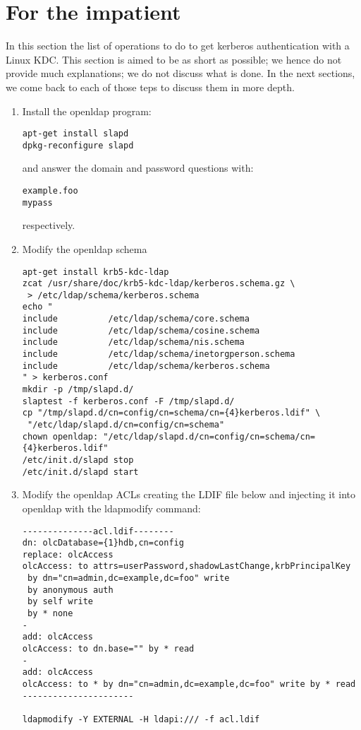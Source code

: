 \documentclass[12pt,a4]{article}
\begin{document}
\section{For the impatient}
In this section the list of operations to do to get kerberos authentication with a Linux KDC. This section is aimed to be as short as possible; we hence do not provide much explanations; we do not discuss what is done. In the next sections, we come back to each of those teps to discuss them in more depth.
\begin{enumerate}

\item Install the openldap program:
\begin{verbatim}
apt-get install slapd
dpkg-reconfigure slapd
\end{verbatim}
and answer the domain and password questions with:
\begin{verbatim}
example.foo
mypass
\end{verbatim}
respectively.
\item {Modify the openldap schema}
\begin{verbatim}
apt-get install krb5-kdc-ldap
zcat /usr/share/doc/krb5-kdc-ldap/kerberos.schema.gz \
 > /etc/ldap/schema/kerberos.schema
echo "
include          /etc/ldap/schema/core.schema
include          /etc/ldap/schema/cosine.schema
include          /etc/ldap/schema/nis.schema
include          /etc/ldap/schema/inetorgperson.schema
include          /etc/ldap/schema/kerberos.schema
" > kerberos.conf 
mkdir -p /tmp/slapd.d/
slaptest -f kerberos.conf -F /tmp/slapd.d/
cp "/tmp/slapd.d/cn=config/cn=schema/cn={4}kerberos.ldif" \
 "/etc/ldap/slapd.d/cn=config/cn=schema"
chown openldap: "/etc/ldap/slapd.d/cn=config/cn=schema/cn={4}kerberos.ldif"
/etc/init.d/slapd stop
/etc/init.d/slapd start
\end{verbatim}
\item Modify the openldap ACLs creating the LDIF file below and injecting it into openldap with the ldapmodify command:
\begin{verbatim}
--------------acl.ldif--------
dn: olcDatabase={1}hdb,cn=config
replace: olcAccess
olcAccess: to attrs=userPassword,shadowLastChange,krbPrincipalKey 
 by dn="cn=admin,dc=example,dc=foo" write 
 by anonymous auth 
 by self write 
 by * none
-
add: olcAccess
olcAccess: to dn.base="" by * read
-
add: olcAccess
olcAccess: to * by dn="cn=admin,dc=example,dc=foo" write by * read
----------------------

ldapmodify -Y EXTERNAL -H ldapi:/// -f acl.ldif
\end{verbatim}


\end{enumerate}
\end{document}
